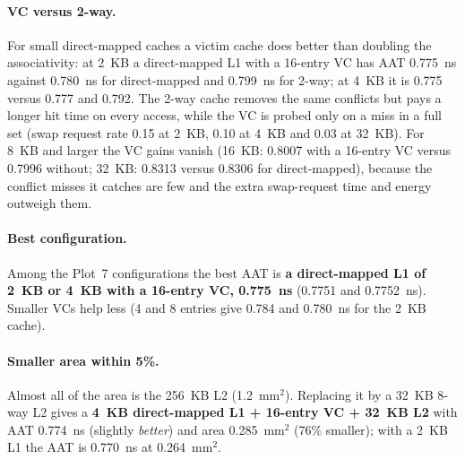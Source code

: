 \documentclass[11pt]{article}
\begin{document}
\paragraph{VC versus 2-way.} For small direct-mapped caches a victim cache does better than doubling the associativity: at 2~KB a direct-mapped L1 with a 16-entry VC has AAT 0.775~ns against 0.780~ns for direct-mapped and 0.799~ns for 2-way; at 4~KB it is 0.775 versus 0.777 and 0.792. The 2-way cache removes the same conflicts but pays a longer hit time on every access, while the VC is probed only on a miss in a full set (swap request rate 0.15 at 2~KB, 0.10 at 4~KB and 0.03 at 32~KB). For 8~KB and larger the VC gains vanish (16~KB: 0.8007 with a 16-entry VC versus 0.7996 without; 32~KB: 0.8313 versus 0.8306 for direct-mapped), because the conflict misses it catches are few and the extra swap-request time and energy outweigh them.

\paragraph{Best configuration.} Among the Plot~7 configurations the best AAT is \textbf{a direct-mapped L1 of 2~KB or 4~KB with a 16-entry VC, 0.775~ns} (0.7751 and 0.7752~ns). Smaller VCs help less (4 and 8 entries give 0.784 and 0.780~ns for the 2~KB cache).

\paragraph{Smaller area within 5\%.} Almost all of the area is the 256~KB L2 (1.2~mm$^2$). Replacing it by a 32~KB 8-way L2 gives a \textbf{4~KB direct-mapped L1 + 16-entry VC + 32~KB L2} with AAT 0.774~ns (slightly \emph{better}) and area 0.285~mm$^2$ (76\% smaller); with a 2~KB L1 the AAT is 0.770~ns at 0.264~mm$^2$.
\end{document}
